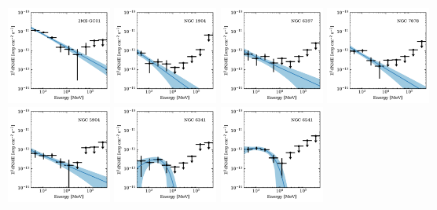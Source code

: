 \documentclass[doublespace,nopageskip]{VTthesis} %
\begin{document}
\begin{appendices}
\begin{figure}
\centering
\includegraphics[width=0.24\textwidth]{Figures/Globular/spectra/PL_spectrum_0.pdf}
\includegraphics[width=0.24\textwidth]{Figures/Globular/spectra/PL_spectrum_4.pdf}
\includegraphics[width=0.24\textwidth]{Figures/Globular/spectra/PL_spectrum_16.pdf}
\includegraphics[width=0.24\textwidth]{Figures/Globular/spectra/PL_spectrum_26.pdf}
\includegraphics[width=0.24\textwidth]{Figures/Globular/spectra/PL_spectrum_7.pdf}
\includegraphics[width=0.24\textwidth]{Figures/Globular/spectra/PLE_spectrum_14.pdf}
\includegraphics[width=0.24\textwidth]{Figures/Globular/spectra/PLE_spectrum_21.pdf}

\end{figure}
\end{appendices}
\end{document}
